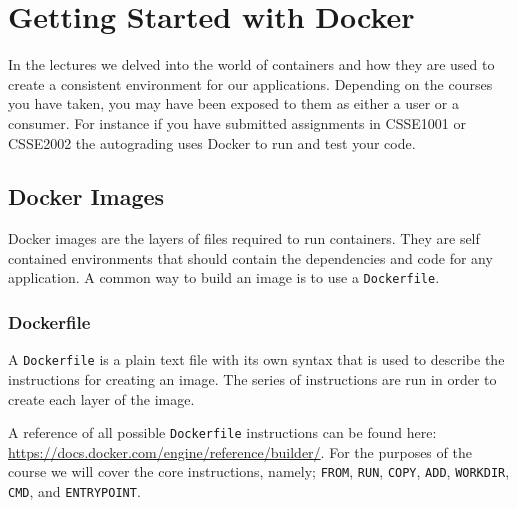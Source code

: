 \documentclass{csse4400}
\begin{document}


\section{Getting Started with Docker}

In the lectures we delved into the world of containers and how they are used to create a consistent environment for our applications.
Depending on the courses you have taken, you may have been exposed to them as either a user or a consumer.
For instance if you have submitted assignments in CSSE1001 or CSSE2002 the autograding uses Docker to run and test your code.



\subsection{Docker Images}
\label{docker-images}

Docker images are the layers of files required to run containers.
They are self contained environments that should contain the dependencies and code for any application.
A common way to build an image is to use a \texttt{Dockerfile}.

\subsubsection{Dockerfile}

A \texttt{Dockerfile} is a plain text file with its own syntax that is used to describe the instructions for creating an image.
The series of instructions are run in order to create each layer of the image.

A reference of all possible \texttt{Dockerfile} instructions can be found here:
\url{https://docs.docker.com/engine/reference/builder/}.
For the purposes of the course we will cover the core instructions, namely;
\texttt{FROM}, \texttt{RUN}, \texttt{COPY}, \texttt{ADD}, \texttt{WORKDIR}, \texttt{CMD}, and \texttt{ENTRYPOINT}.
\end{document}
